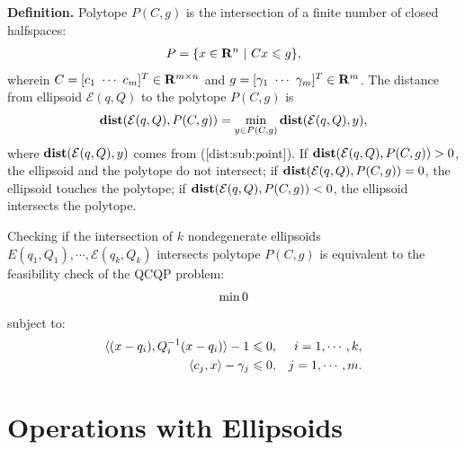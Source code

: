 \documentclass[letterpaper,10pt,english]{sphinxmanual}
\begin{document}
\textbf{Definition.} Polytope \(P(C,g)\) is the
intersection of a finite number of closed halfspaces:
\label{chap_ellcalc:equation-polytope}\begin{gather}
\begin{split}P = \{x\in{\bf R}^n ~|~ Cx\leqslant g\},\end{split}\label{chap_ellcalc-polytope}
\end{gather}
wherein \(C=[c_1 ~ \cdots ~ c_m]^T\in{\bf R}^{m\times n}\) and
\(g=[\gamma_1 ~ \cdots ~ \gamma_m]^T\in{\bf R}^m\).
The distance
from ellipsoid \({\mathcal E}(q,Q)\) to the polytope \(P(C,g)\)
is
\label{chap_ellcalc:equation-dist_poly}\begin{gather}
\begin{split}{\bf dist}({\mathcal E}(q,Q),P(C,g))=\min_{y\in P(C,g)}{\bf dist}({\mathcal E}(q,Q),y),\end{split}\label{chap_ellcalc-dist_poly}
\end{gather}
where \({\bf dist}({\mathcal E}(q,Q),y)\) comes from
({[}dist:sub:\emph{p}oint{]}). If
\({\bf dist}({\mathcal E}(q,Q),P(C,g))>0\), the ellipsoid and the
polytope do not intersect; if
\({\bf dist}({\mathcal E}(q,Q),P(C,g))=0\), the ellipsoid touches
the polytope; if \({\bf dist}({\mathcal E}(q,Q),P(C,g))<0\), the
ellipsoid intersects the polytope.

Checking if the intersection of \(k\) nondegenerate ellipsoids
\(E(q_1,Q_1),\cdots,{\mathcal E}(q_k,Q_k)\) intersects polytope
\(P(C,g)\) is equivalent to the feasibility check of the QCQP
problem:
\begin{gather}
\begin{split}\min 0\end{split}\notag
\end{gather}
subject to:
\begin{gather}
\begin{split}\begin{aligned}
\langle (x-q_i),Q_i^{-1}(x-q_i)\rangle - 1 \leqslant0, & & i=1,\cdots,k,\\
\langle c_j, x\rangle - \gamma_j \leqslant0, & & j=1,\cdots,m.\end{aligned}\end{split}\notag
\end{gather}

\section{Operations with Ellipsoids}
\label{chap_ellcalc:operations-with-ellipsoids}
\end{document}
